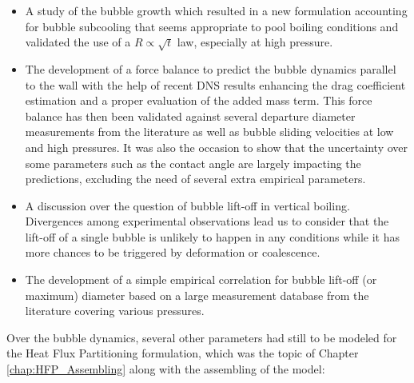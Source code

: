 \begin{itemize}
\item A study of the bubble growth which resulted in a new formulation accounting for bubble subcooling that seems appropriate to pool boiling conditions and validated the use of a $R \propto \sqrt{t}$ law, especially at high pressure.

\item The development of a force balance to predict the bubble dynamics parallel to the wall with the help of recent DNS results \cite{shi_drag_2021} enhancing the drag coefficient estimation and a proper evaluation of the added mass term. This force balance has then been validated against several departure diameter measurements from the literature as well as bubble sliding velocities at low and high pressures. It was also the occasion to show that the uncertainty over some parameters such as the contact angle are largely impacting the predictions, excluding the need of several extra empirical parameters.

\item A discussion over the question of bubble lift-off in vertical boiling. Divergences among experimental observations lead us to consider that the lift-off of a single bubble is unlikely to happen in any conditions while it has more chances to be triggered by deformation or coalescence.

\item The development of a simple empirical correlation for bubble lift-off (or maximum) diameter based on a large measurement database from the literature covering various pressures.
\end{itemize}

Over the bubble dynamics, several other parameters had still to be modeled for the Heat Flux Partitioning formulation, which was the topic of Chapter \ref{chap:HFP_Assembling} along with the assembling of the model:


